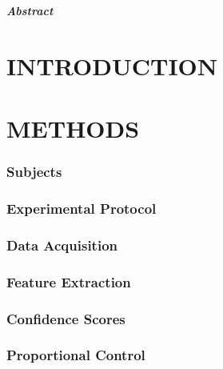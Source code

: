 \begin{multicols}{2}
	
	
	\textbf{\textit{Abstract} 
		}
	
	
	\section*{INTRODUCTION}%
	
	
	
	
	\section*{METHODS}%
	
	\subsubsection*{Subjects}
	
	
	
	\subsubsection*{Experimental Protocol}
	
	
	
	\subsubsection*{Data Acquisition}
	 
	
	\subsubsection*{Feature Extraction}
	
	
	\subsubsection*{Confidence Scores} 
	 
	
	\subsubsection*{Proportional Control}
	
	

\end{multicols}
